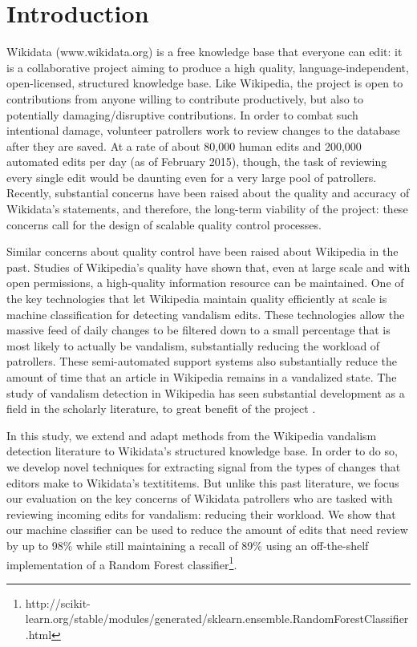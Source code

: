 \documentclass{sig-alternate}
\begin{document}

\printccsdesc

\section{Introduction}
Wikidata (www.wikidata.org) is a free knowledge base that everyone can edit: it is a collaborative project aiming to produce a high quality, language-independent, open-licensed, structured knowledge base.  Like Wikipedia, the project is open to contributions from anyone willing to contribute productively, but also to potentially damaging/disruptive contributions. In order to combat such intentional damage, volunteer patrollers work to review changes to the database after they are saved. At a rate of about 80,000 human edits and 200,000 automated edits per day (as of February 2015), though, the task of reviewing every single edit would be daunting even for a very large pool of patrollers. Recently, substantial concerns have been raised about the quality and accuracy of Wikidata's statements\cite{kolbe:whither}, and therefore, the long-term viability of the project: these concerns call for the design of scalable quality control processes.

Similar concerns about quality control have been raised about Wikipedia in the past\cite{giles:internet}.  Studies of Wikipedia's quality have shown that, even at large scale and with open permissions, a high-quality information resource can be maintained\cite{giles:internet, stvilia:information}.  One of the key technologies that let Wikipedia maintain quality efficiently at scale is machine classification for detecting vandalism edits. These technologies allow the massive feed of daily changes to be filtered down to a small percentage that is most likely to actually be vandalism, substantially reducing the workload of patrollers\cite{geiger:levee, geiger:work}.  These semi-automated support systems also substantially reduce the amount of time that an article in Wikipedia remains in a vandalized state\cite{geiger:levee}.  The study of vandalism detection in Wikipedia has seen substantial development as a field in the scholarly literature, to great benefit of the project \cite{wang:got, harpalani:language, adler:detecting, adler:wikipedia}.

In this study, we extend and adapt methods from the Wikipedia vandalism detection literature to Wikidata's structured knowledge base.  In order to do so, we develop novel techniques for extracting signal from the types of changes that editors make to Wikidata's textit{items}. But unlike this past literature, we focus our evaluation on the key concerns of Wikidata patrollers who are tasked with reviewing incoming edits for vandalism: reducing their workload. We show that our machine classifier can be used to reduce the amount of edits that need review by up to 98\% while still maintaining a recall of 89\% using an off-the-shelf implementation of a Random Forest classifier\cite{breiman:random}\footnote{http://scikit-learn.org/stable/modules/generated/sklearn.ensemble.RandomForestClassifier.html}.
\end{document}
